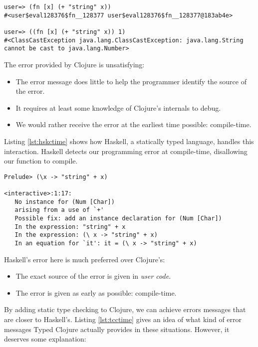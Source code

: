 \begin{lstlisting}[caption=Runtime type errors in Clojure, label=lst:cljrtime]
user=> (fn [x] (+ "string" x))
#<user$eval128376$fn__128377 user$eval128376$fn__128377@183ab4e>

user=> ((fn [x] (+ "string" x)) 1)
#<ClassCastException java.lang.ClassCastException: java.lang.String cannot be cast to java.lang.Number>
\end{lstlisting}

The error provided by Clojure is unsatisfying:

\begin{itemize}
  \item The error message does little to help the programmer identify the source of the error.
  \item It requires at least some knowledge of Clojure's internals to debug.
  \item We would rather receive the error at the earliest time possible: compile-time.
\end{itemize}

Listing \ref{lst:hskctime} shows how Haskell, a statically typed language, handles this interaction.
Haskell detects our programming error at compile-time, disallowing our function to compile.

\begin{lstlisting}[caption=Compile-time type errors in Haskell, label=lst:hskctime]
Prelude> (\x -> "string" + x)

<interactive>:1:17:
   No instance for (Num [Char])
   arising from a use of `+'
   Possible fix: add an instance declaration for (Num [Char])
   In the expression: "string" + x
   In the expression: (\ x -> "string" + x)
   In an equation for `it': it = (\ x -> "string" + x)
\end{lstlisting}

Haskell's error here is much preferred over Clojure's:

\begin{itemize}
  \item The exact source of the error is given in \emph{user code}.
  \item The error is given as early as possible: compile-time.
\end{itemize}

By adding static type checking to Clojure, we can achieve errors messages that are closer to
Haskell's.
Listing \ref{lst:tcctime} gives an idea of what kind of error messages Typed Clojure actually
provides in these situations. 
However, it deserves some explanation:

